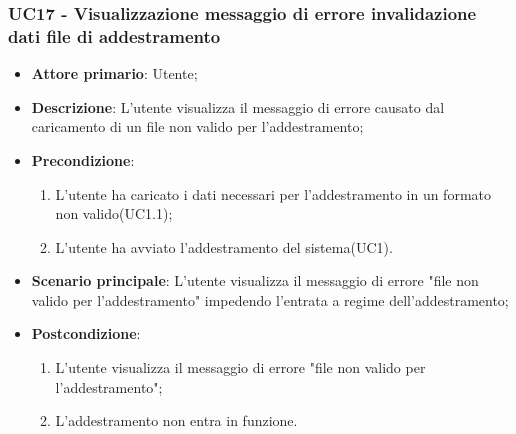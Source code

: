 \subsubsection{UC17 - Visualizzazione messaggio di errore invalidazione dati file di addestramento}
\label{sssec:uc17}
\begin{itemize}
  \item \textbf{Attore primario}: Utente;
  \item \textbf{Descrizione}: L'utente visualizza il messaggio di errore causato dal caricamento di un file non valido per l'addestramento;
  \item \textbf{Precondizione}:
  \begin{enumerate}
		\item L'utente ha caricato i dati necessari per l'addestramento in un formato non valido(UC1.1);
		\item L'utente ha avviato l'addestramento del sistema(UC1).
	\end{enumerate}
  \item \textbf{Scenario principale}: L'utente visualizza il messaggio di errore "file non valido per l'addestramento" impedendo l'entrata a regime dell'addestramento;
  \item \textbf{Postcondizione}:
  \begin{enumerate}
		\item L'utente visualizza il messaggio di errore "file non valido per l'addestramento";
		\item L'addestramento non entra in funzione.
	\end{enumerate}
\end{itemize}
